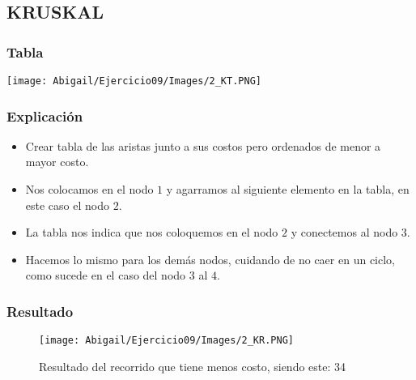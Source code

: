 \documentclass[12pt]{article}
\begin{document}
    \subsection{KRUSKAL}
        \begin{multicols}{2}
                \subsubsection{Tabla}
                 \texttt{[image: Abigail/Ejercicio09/Images/2\_KT.PNG]}
                  
            \columnbreak
            
                \subsubsection{Explicación}
                    \begin{itemize}
            
                     \item[\checkmark] Crear tabla de las aristas junto a sus costos pero ordenados de menor a mayor costo.
    
                      \item[\checkmark] Nos colocamos en el nodo $1$ y agarramos al siguiente elemento en la tabla, en este caso el nodo $2$.
                      
                      \item[\checkmark] La tabla nos indica que nos coloquemos en el nodo $2$ y conectemos al nodo $3$.
                      
                      \item[\checkmark] Hacemos lo mismo para los demás nodos, cuidando de no caer en un ciclo, como sucede en el caso del nodo $3$ al $4$.
            
                    \end{itemize}
            \end{multicols}

      \subsubsection{Resultado}

        \begin{figure}[h!]
          \centering
          \texttt{[image: Abigail/Ejercicio09/Images/2\_KR.PNG]}
          \caption{Resultado del recorrido que tiene menos costo, siendo este: 34}
        \end{figure} 
\newpage
  
\end{document}

